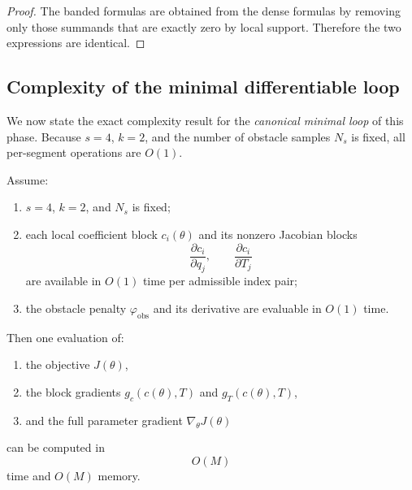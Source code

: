 \begin{proof}
The banded formulas are obtained from the dense formulas by removing only those summands that are exactly zero by local support.
Therefore the two expressions are identical.
\end{proof}

\subsection{Complexity of the minimal differentiable loop}
\label{subsec:phase9_complexity}

We now state the exact complexity result for the \emph{canonical minimal loop} of this phase.
Because \(s=4\), \(k=2\), and the number of obstacle samples \(N_s\) is fixed, all per-segment operations are \(O(1)\).

\begin{theorem}
\label{thm:phase9_linear_complexity}
Assume:
\begin{enumerate}
    \item \(s=4\), \(k=2\), and \(N_s\) is fixed;
    \item each local coefficient block \(c_i(\theta)\) and its nonzero Jacobian blocks
    \[
    \frac{\partial c_i}{\partial q_j},\qquad
    \frac{\partial c_i}{\partial T_j}
    \]
    are available in \(O(1)\) time per admissible index pair;
    \item the obstacle penalty \(\varphi_{\mathrm{obs}}\) and its derivative are evaluable in \(O(1)\) time.
\end{enumerate}
Then one evaluation of:
\begin{enumerate}
    \item the objective \(J(\theta)\),
    \item the block gradients \(g_c(c(\theta),T)\) and \(g_T(c(\theta),T)\),
    \item and the full parameter gradient \(\nabla_\theta J(\theta)\)
\end{enumerate}
can be computed in
\begin{equation}
\label{eq:phase9_linear_complexity}
O(M)
\end{equation}
time and \(O(M)\) memory.
\end{theorem}

